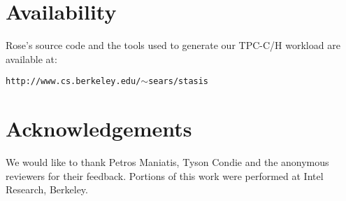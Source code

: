 \documentclass{vldb}
\newcommand{\rowss}{Rose's\xspace}
\begin{document}
\section{Availability}
\label{sec:avail}
\rowss source code and the tools used to generate our TPC-C/H workload
are available at:

{\tt http://www.cs.berkeley.edu/$\sim$sears/stasis}

\section{Acknowledgements}

We would like to thank Petros Maniatis, Tyson Condie and the
anonymous reviewers for their feedback.  Portions of this work were
performed at Intel Research, Berkeley.


%
%
\balancecolumns %
\end{document}
